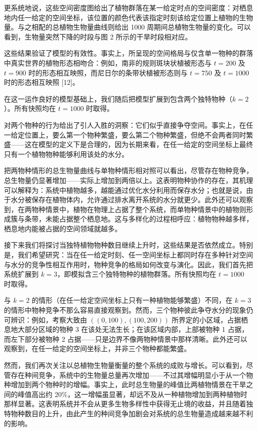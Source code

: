 \documentclass[11pt,a4paper]{ctexart}
\begin{document}
更系统地说，这些空间密度图给出了植物群落在某一给定时点的空间密度：对栖息地内任一给定的空间坐标，该位置的颜色代表该指定时刻该给定位置上植物的生物量。与之相配的总植物生物量曲线则给出 1000 周期间总植物生物量的变化。可以看到，生物量突然下降的时段与图 2 所示的干旱时段相对应。

这些结果验证了模型的有效性。事实上，所呈现的空间格局与仅含单一物种的群落中真实世界的植物形态相吻合：例如，南非的规则斑块状植被形态与 $t=200$ 及 $t=900$ 时的形态相互映照，而尼日尔的条带状植被形态则与 $t=750$ 及 $t=1000$ 时的形态相互映照 [12]。

在这一运作良好的模型基础上，我们随后把模型扩展到包含两个独特物种（$k=2$）。所有快照均在 $t=1000$ 时取得。

对两个物种的行为给出了引人入胜的洞察：它们似乎直接争夺空间。事实上，在任一给定位置上，要么第一个物种繁盛，要么第二个物种繁盛，但绝不会两者同时繁盛——这在模型的定义下是合理的，因为长期来看，在任一给定的空间坐标上最终只有一个植物物种能够利用该处的水分。

把两物种情形的总生物量曲线与单物种情形相对照可以看出，尽管存在物种竞争，总生物量仍显著增加——实际上增加到两倍以上。这表明物种协作的存在，其机理可以解释为：系统中植物越多，越能通过优化水分利用而保存水分；也就是说，由于水分被保存在植物体内，允许通过排水离开系统的水分就更少。此外还可以观察到，在两物种情景中，植物在物理上占据了整个系统，而单物种情景中的植物则形成簇与条带，未能占据整个栖息地。这与多样化的过程相呼应：植物物种越多样，栖息地内能被占据的空间领域就越多。

接下来我们将探讨当独特植物物种数目继续上升时，这些结果是否依然成立。特别是，我们希望研究：当在任一给定时刻、任一空间坐标上都同时存在多种针对空间与水分的竞争性相互作用时，物种竞争的格局如何改变与演化。因此，我们首先把系统扩展到 $k=3$，即模拟含三个独特物种的植物群落。所有快照均在 $t=1000$ 时取得。

与 $k=2$ 的情形（在任一给定空间坐标上只有一种植物能够繁盛）不同，在 $k=3$ 的情形中物种竞争不那么容易直接观察到。然而，三个物种彼此争夺水分的现象仍可辨识：例如，考察大致由 $((0,100),(100,200))$ 所界定的小区域，占据栖息地大部分区域的物种 3 在该处无法生长；在该区域内部，上部被物种 1 占据，而左下部分被物种 2 占据——只是边界不像两物种情景中那样清晰。此外还可以观察到，在任一给定的空间坐标上，并非三个物种都能繁盛。

然而，我们再次关注以总植物生物量衡量的整个系统的成败与增长。可以看到，尽管存在种间竞争，系统中的生物量总量再次增加——不过其增幅明显小于从一个物种增加到两个物种时的增幅。事实上，此时总生物量的峰值比两植物情景在干旱之间的峰值高出约 20\%，这一增幅虽显著，却远不及从一种植物增加到两种植物时那样显著。这表明系统并不会从更多生物多样性中获得无止境的收益，并且随着独特物种数目的上升，由此产生的种间竞争加剧会对系统的总生物量造成越来越不利的影响。
\end{document}
